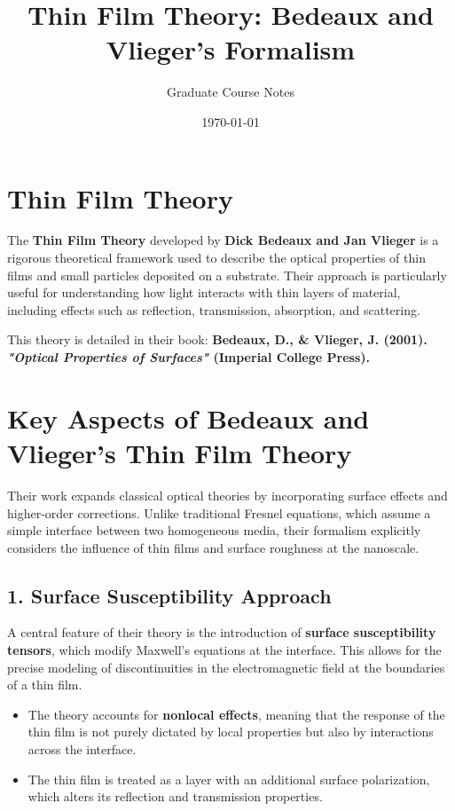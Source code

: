 \documentclass{article}
\begin{document}
	
	\title{Thin Film Theory: Bedeaux and Vlieger's Formalism}
	\author{Graduate Course Notes}
	\date{\today}
	\maketitle
			
		\section*{Thin Film Theory}
		
		The \textbf{Thin Film Theory} developed by \textbf{Dick Bedeaux and Jan Vlieger} is a rigorous theoretical framework used to describe the optical properties of thin films and small particles deposited on a substrate. Their approach is particularly useful for understanding how light interacts with thin layers of material, including effects such as reflection, transmission, absorption, and scattering.  
		
		This theory is detailed in their book:  
		\textbf{Bedeaux, D., \& Vlieger, J. (2001). \textit{"Optical Properties of Surfaces"} (Imperial College Press).}  
		
		\section*{Key Aspects of Bedeaux and Vlieger’s Thin Film Theory}
		Their work expands classical optical theories by incorporating surface effects and higher-order corrections. Unlike traditional Fresnel equations, which assume a simple interface between two homogeneous media, their formalism explicitly considers the influence of thin films and surface roughness at the nanoscale.
		
		\subsection*{1. Surface Susceptibility Approach}
		A central feature of their theory is the introduction of \textbf{surface susceptibility tensors}, which modify Maxwell’s equations at the interface. This allows for the precise modeling of discontinuities in the electromagnetic field at the boundaries of a thin film.
		
		\begin{itemize}
			\item The theory accounts for \textbf{nonlocal effects}, meaning that the response of the thin film is not purely dictated by local properties but also by interactions across the interface.
			\item The thin film is treated as a layer with an additional surface polarization, which alters its reflection and transmission properties.
		\end{itemize}
		
\end{document}
